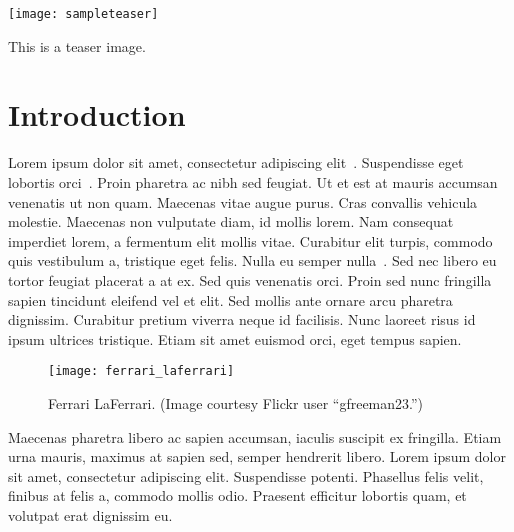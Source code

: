 \documentclass[sigconf,review,anonymous]{acmart}
\begin{document}



\begin{teaserfigure}
  \texttt{[image: sampleteaser]}
  \caption{This is a teaser image.}
  \label{fig:teaser}
\end{teaserfigure}


\maketitle

\section{Introduction}

Lorem ipsum dolor sit amet, consectetur adipiscing elit~\cite{Pellacini:2005:LAH}. Suspendisse eget lobortis orci~\cite{Boechat:2016:RSP:2980179.2980227}. Proin pharetra ac nibh sed feugiat. Ut et est at mauris accumsan venenatis ut non quam. Maecenas vitae augue purus. Cras convallis vehicula molestie. Maecenas non vulputate diam, id mollis lorem. Nam consequat imperdiet lorem, a fermentum elit mollis vitae. Curabitur elit turpis, commodo quis vestibulum a, tristique eget felis. Nulla eu semper nulla~\cite{notes2002, Jobson95}. Sed nec libero eu tortor feugiat placerat a at ex. Sed quis venenatis orci. Proin sed nunc fringilla sapien tincidunt eleifend vel et elit. Sed mollis ante ornare arcu pharetra dignissim. Curabitur pretium viverra neque id facilisis. Nunc laoreet risus id ipsum ultrices tristique. Etiam sit amet euismod orci, eget tempus sapien.

\begin{figure}[ht]
  \centering
  \texttt{[image: ferrari\_laferrari]}
  \caption{Ferrari LaFerrari. (Image courtesy Flickr user ``gfreeman23.'')}
  \label{fig:ferrari}
\end{figure}

Maecenas pharetra libero ac sapien accumsan, iaculis suscipit ex fringilla. Etiam urna mauris, maximus at sapien sed, semper hendrerit libero. Lorem ipsum dolor sit amet, consectetur adipiscing elit. Suspendisse potenti. Phasellus felis velit, finibus at felis a, commodo mollis odio. Praesent efficitur lobortis quam, et volutpat erat dignissim eu. 
\end{document}

